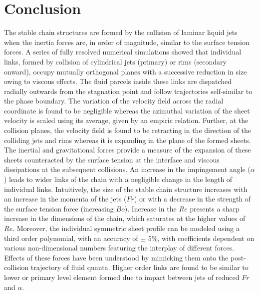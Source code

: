\documentclass[%
 aip,
 sd,%
amsmath,amssymb,
preprint,%
author-year,%
]{revtex4-1}
\begin{document}
\section{Conclusion}
The stable chain structures are formed by the collision of laminar liquid jets when the inertia forces are, in order of magnitude, similar to the surface tension forces. {\color{red}A series of fully resolved} numerical simulations showed that individual links, formed by collision of cylindrical jets (primary) or rims (secondary onward), occupy mutually orthogonal planes with a successive reduction in size owing to viscous effects. The fluid parcels inside these links are dispatched radially outwards from the stagnation point and follow trajectories self-similar to the phase boundary. {\color{red}The variation of the velocity field across the radial coordinate is found to be negligible whereas the azimuthal variation of the sheet velocity is scaled using its average, given by an empiric relation. Further, at the collision planes, the velocity field is found to be retracting in the direction of the colliding jets and rims whereas it is expanding in the plane of the formed sheets. The inertial and gravitational forces provide a measure of the expansion of these sheets counteracted by the surface tension at the interface and viscous dissipations at the subsequent collisions. An increase in the impingement angle ($\alpha$) leads to wider links of the chain with a negligible change in the length of individual links. Intuitively, the size of the stable chain structure increases with an increase in the momenta of the jets ($Fr$) or with a decrease in the strength of the surface tension force (increasing $Bo$). Increase in the $Re$ presents a sharp increase in the dimensions of the chain, which saturates at the higher values of $Re$. Moreover, the individual} symmetric sheet profile can be modeled using a third order polynomial, with an accuracy of $\pm$ 5\%, with coefficients dependent on various non-dimensional numbers featuring the interplay of different forces. Effects of these forces have been understood by mimicking them onto the post-collision trajectory of fluid quanta. Higher order links are found to be similar to lower or primary level element formed due to impact between jets of reduced $Fr$ and $\alpha$. 

\end{document}
